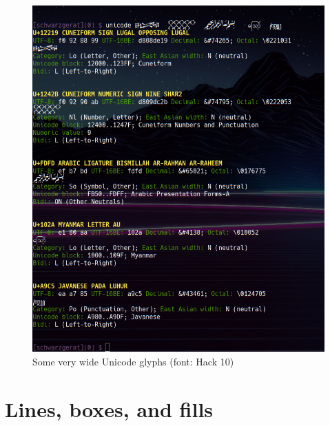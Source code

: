 \documentclass[letterpaper,10pt]{article}
\begin{document}
\begin{figure}
\centering
\includegraphics[width=1\linewidth]{media/wide-unicode.png}
\caption[Some very wide Unicode glyphs]{Some very wide Unicode glyphs (font: Hack 10)}
\label{fig:wideglyphs}
\end{figure}

\newpage

\newpage


\newpage

\section{Lines, boxes, and fills}
\end{document}
